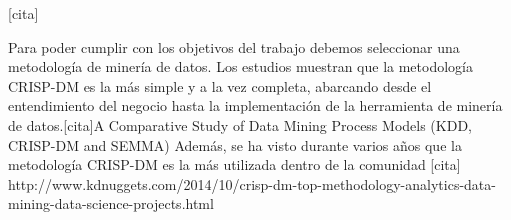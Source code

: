 [cita] 

Para poder cumplir con los objetivos del trabajo debemos seleccionar una metodología de minería de datos. Los estudios muestran que la metodología CRISP-DM es la más simple y a la vez completa, abarcando desde el entendimiento del negocio hasta la implementación de la herramienta de minería de datos.[cita]A Comparative Study of Data Mining Process Models (KDD, CRISP-DM and SEMMA) Además, se ha visto durante varios años que la metodología CRISP-DM es la más utilizada dentro de la comunidad [cita] http://www.kdnuggets.com/2014/10/crisp-dm-top-methodology-analytics-data-mining-data-science-projects.html

